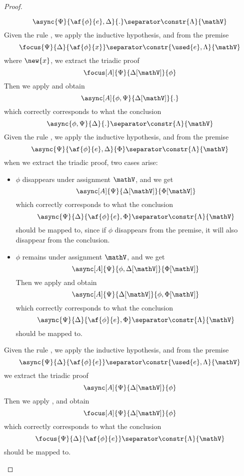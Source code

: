\begin{proof}
\begin{itemize}
			$$ \async{\Psi}{\af{\phi}{e}, \Delta}{.} \separator \constr{\Lambda}{\mathV} $$
		\indCase{\displaydecide[2]} Given the rule \derRule{\displaydecide[2]}, we apply the inductive hypothesis, and from the premise
			$$ \focus{\Psi}{\Delta}{\af{\phi}{x}} \separator \constr{\used{e}, \Lambda}{\mathV} $$
			where $\new{x}$, we extract the triadic proof
			$$ \focus[A]{\Psi}{\Delta[\mathV]}{\phi} $$
			Then we apply \derRule[A]{\displaydecide[2]} and obtain
			$$ \async[A]{\phi, \Psi}{ \Delta[\mathV]}{.} $$
			which correctly corresponds to what the conclusion
			$$ \async{\phi, \Psi}{\Delta}{.} \separator \constr{\Lambda}{\mathV} $$
		\indCase{\displaytodelta} Given the rule \derRule{\displaytodelta}, we apply the inductive hypothesis, and from the premise
			$$ \async{\Psi}{\af{\phi}{e}, \Delta}{\Phi} \separator \constr{\Lambda}{\mathV} $$
			when we extract the triadic proof, two cases arise:
			\begin{itemize}
				\item $\phi$ disappears under assignment $\mathV$, and we get
					$$ \async[A]{\Psi}{\Delta[\mathV]}{\Phi[\mathV]} $$
					which correctly corresponds to what the conclusion
					$$ \async{\Psi}{\Delta}{\af{\phi}{e}, \Phi} \separator \constr{\Lambda}{\mathV} $$
					should be mapped to, since if $\phi$ disappears from the premise, it will also disappear from the conclusion.
				\item $\phi$ remains under assignment $\mathV$, and we get
					$$ \async[A]{\Psi}{\phi, \Delta[\mathV]}{\Phi[\mathV]} $$
					Then we apply \derRule[A]{\displaytodelta} and obtain
					$$ \async[A]{\Psi}{\Delta[\mathV]}{\phi, \Phi[\mathV]} $$
					which correctly corresponds to what the conclusion
					$$ \async{\Psi}{\Delta}{\af{\phi}{e}, \Phi} \separator \constr{\Lambda}{\mathV} $$
					should be mapped to.
			\end{itemize}
		\indCase{\displaytoasy} Given the rule \derRule{\displaytoasy}, we apply the inductive hypothesis, and from the premise
			$$ \async{\Psi}{\Delta}{\af{\phi}{e}} \separator \constr{\used{e}, \Lambda}{\mathV} $$
			we extract the triadic proof
			$$ \async[A]{\Psi}{\Delta[\mathV]}{\phi} $$
			Then we apply \derRule[A]{\displaytoasy}, and obtain
			$$ \focus[A]{\Psi}{\Delta[\mathV]}{\phi} $$
			which correctly corresponds to what the conclusion 
			$$ \focus{\Psi}{\Delta}{\af{\phi}{e}} \separator \constr{\Lambda}{\mathV} $$
			should be mapped to.
	\end{itemize}
\end{proof}


